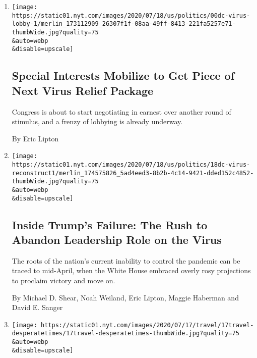 \begin{enumerate}
\def\labelenumi{\arabic{enumi}.}
\item
  \href{/2020/07/19/us/politics/coronavirus-relief-lobbyists-special-interests.html}{}

  \texttt{[image: https://static01.nyt.com/images/2020/07/18/us/politics/00dc-virus-lobby-1/merlin\_173112909\_26307f1f-08aa-49ff-8413-221fa5257e71-thumbWide.jpg?quality=75\\\&auto=webp\\\&disable=upscale]}

  \hypertarget{special-interests-mobilize-to-get-piece-of-next-virus-relief-package}{%
  \subsection{Special Interests Mobilize to Get Piece of Next Virus
  Relief
  Package}\label{special-interests-mobilize-to-get-piece-of-next-virus-relief-package}}

  Congress is about to start negotiating in earnest over another round
  of stimulus, and a frenzy of lobbying is already underway.

  By Eric Lipton
\item
  \href{/2020/07/18/us/politics/trump-coronavirus-response-failure-leadership.html}{}

  \texttt{[image: https://static01.nyt.com/images/2020/07/18/us/politics/18dc-virus-reconstruct1/merlin\_174575826\_5ad4eed3-8b2b-4c14-9421-dded152c4852-thumbWide.jpg?quality=75\\\&auto=webp\\\&disable=upscale]}

  \hypertarget{inside-trumps-failure-the-rush-to-abandon-leadership-role-on-the-virus}{%
  \subsection{Inside Trump's Failure: The Rush to Abandon Leadership
  Role on the
  Virus}\label{inside-trumps-failure-the-rush-to-abandon-leadership-role-on-the-virus}}

  The roots of the nation's current inability to control the pandemic
  can be traced to mid-April, when the White House embraced overly rosy
  projections to proclaim victory and move on.

  By Michael D. Shear, Noah Weiland, Eric Lipton, Maggie Haberman and
  David E. Sanger
\item
  \href{/2020/07/16/travel/virus-vacation.html}{}

  \texttt{[image: https://static01.nyt.com/images/2020/07/17/travel/17travel-desperatetimes/17travel-desperatetimes-thumbWide.jpg?quality=75\\\&auto=webp\\\&disable=upscale]}


\end{enumerate}
